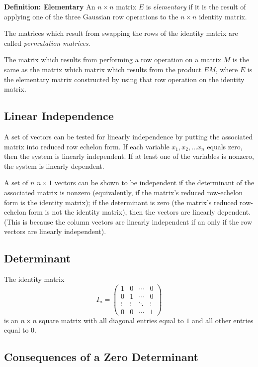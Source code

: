 \documentclass[12pt]{article}
\begin{document}
	\textbf{Definition: Elementary} An $n\times n$ matrix $E$ is \textit{elementary} if it is the result of applying one of the three Gaussian row operations to the $n\times n$ identity matrix.
	
	The matrices which result from swapping the rows of the identity matrix are called \textit{permutation matrices}.
	
	The matrix which results from performing a row operation on a matrix $M$ is the same as the matrix which matrix which results from the product $EM$, where $E$ is the elementary matrix constructed by using that row operation on the identity matrix.
	
	\subsection{Linear Independence}

	A set of vectors can be tested for linearly independence by putting the associated matrix into reduced row echelon form. If each variable $x_{1}, x_{2},\ldots x_{n}$ equals zero, then the system is linearly independent. If at least one of the variables is nonzero, the system is linearly dependent.
	
	A set of $n$ $n \times 1$ vectors can be shown to be independent if the determinant of the associated matrix is nonzero (equivalently, if the matrix's reduced row-echelon form is the identity matrix); if the determinant is zero (the matrix's reduced row-echelon form is not the identity matrix), then the vectors are linearly dependent. (This is because the column vectors are linearly independent if an only if the row vectors are linearly independent).

	\subsection{Determinant}
	
	The identity matrix $$I_{n} =
	\begin{pmatrix}
	1      & 0      & \cdots & 0     \\
	0      & 1      & \cdots & 0     \\
	\vdots & \vdots & \ddots & \vdots\\
	0      & 0      & \cdots & 1
	
	\end{pmatrix}$$ is an $n \times n$ square matrix with all diagonal entries equal to $1$ and all other entries equal to $0$.
	
	\subsection{Consequences of a Zero Determinant}
	
\end{document}
